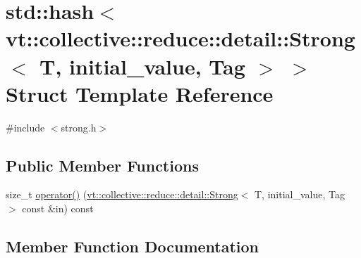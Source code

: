 \hypertarget{structstd_1_1hash_3_01vt_1_1collective_1_1reduce_1_1detail_1_1_strong_3_01_t_00_01initial__value_00_01_tag_01_4_01_4}{}\section{std\+:\+:hash$<$ vt\+:\+:collective\+:\+:reduce\+:\+:detail\+:\+:Strong$<$ T, initial\+\_\+value, Tag $>$ $>$ Struct Template Reference}
\label{structstd_1_1hash_3_01vt_1_1collective_1_1reduce_1_1detail_1_1_strong_3_01_t_00_01initial__value_00_01_tag_01_4_01_4}


{\ttfamily \#include $<$strong.\+h$>$}

\subsection*{Public Member Functions}
\begin{DoxyCompactItemize}
\item 
size\+\_\+t \hyperlink{structstd_1_1hash_3_01vt_1_1collective_1_1reduce_1_1detail_1_1_strong_3_01_t_00_01initial__value_00_01_tag_01_4_01_4_a5a2669d99c00c64efdbf9cc16c3b6372}{operator()} (\hyperlink{structvt_1_1collective_1_1reduce_1_1detail_1_1_strong}{vt\+::collective\+::reduce\+::detail\+::\+Strong}$<$ T, initial\+\_\+value, Tag $>$ const \&in) const
\end{DoxyCompactItemize}


\subsection{Member Function Documentation}
\mbox{\label{structstd_1_1hash_3_01vt_1_1collective_1_1reduce_1_1detail_1_1_strong_3_01_t_00_01initial__value_00_01_tag_01_4_01_4_a5a2669d99c00c64efdbf9cc16c3b6372}} 
